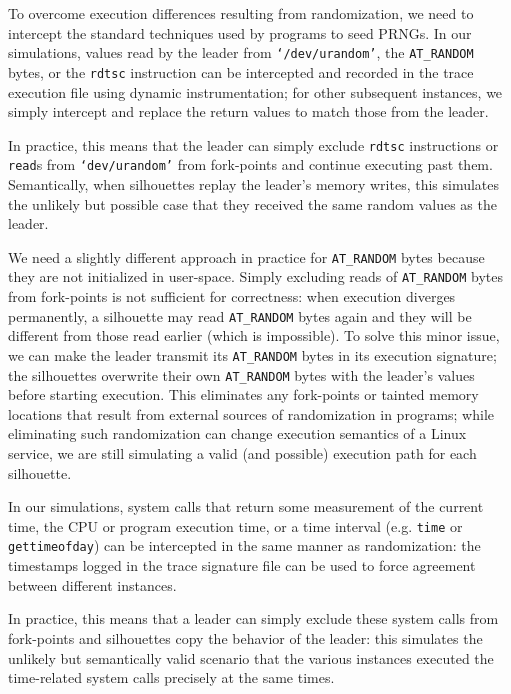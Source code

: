  \newline
To overcome execution differences resulting from randomization,
we need to intercept the standard techniques
used by programs to seed PRNGs.
In our simulations, values read by the leader from \texttt{`/dev/urandom'}, the
\texttt{AT\_RANDOM} bytes, or the \texttt{rdtsc} instruction 
can be intercepted and recorded in the trace execution file using
dynamic instrumentation;
for other subsequent instances, we simply
intercept and replace the return values to match
those from the leader.

In practice, this means that the leader can simply
exclude \texttt{rdtsc} instructions 
or \texttt{read}s from \texttt{`dev/urandom'}
from fork-points and continue executing past them. 
Semantically, when silhouettes replay 
the leader's memory writes, this simulates
the unlikely but possible case that they
received the same random values as the leader.

We need a slightly different approach in practice for \texttt{AT\_RANDOM} bytes because they
are not initialized in user-space.
Simply excluding reads 
of \texttt{AT\_RANDOM} bytes from fork-points
is not sufficient for correctness:
when execution diverges permanently,
a silhouette may read \texttt{AT\_RANDOM}
bytes again and they will be different 
from those read earlier (which is impossible). 
To solve this minor issue, we can make the leader transmit
its \texttt{AT\_RANDOM} bytes
in its execution signature;
the silhouettes overwrite
their own \texttt{AT\_RANDOM}
bytes with the leader's values
before starting execution.
This eliminates
any fork-points or tainted memory
locations that result
from external
sources of randomization
in programs; while
eliminating such randomization
can change execution
semantics of a Linux service,
we are still simulating a valid
(and possible) execution path
for each silhouette. \newline

 \newline
In our simulations, 
system calls that return 
some measurement of the 
current time, the CPU or program execution time, or a time interval 
(e.g. \texttt{time} or \texttt{gettimeofday})
can be intercepted in the same manner
as randomization:
the timestamps logged
in the trace signature file
can be used to force agreement
between different instances.

In practice, this means that a leader can simply
exclude these system calls from fork-points
and silhouettes copy
the behavior of the leader: this
simulates the unlikely 
but semantically valid scenario
that the various instances
executed the time-related system calls
precisely at the same times.

